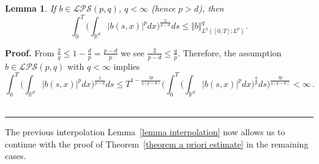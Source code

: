 \documentclass[a4paper,10pt]{article}
\newtheorem{lemma}[theorem]{Lemma}
\newenvironment{proof}[1][Proof]{\noindent\textbf{#1.} }{\ \rule{0.5em}{0.5em}}
\begin{document}
\begin{lemma}
If $b\in\mathcal{LPS}(p,q)$, $q<\infty$ (hence $p>d$), then
\begin{equation}
\int_{0}^{T} \Big( \int_{\mathbb{R}^{d}} \vert b(s,x) \vert
^{p}dx \Big)^{\frac{2}{p-d}}ds\leq \Vert b \Vert _{L^{q}([0,T];L^{p})  }^{q}. \label{bound on b} 
\end{equation}
\end{lemma}

\begin{proof}
From $\frac{2}{q}\leq1-\frac{d}{p}=\frac{p-d}{p}$ we see $\frac{2} 
{p-d}\leq\frac{q}{p}$. Therefore, the assumption $b\in\mathcal{LPS}(p,q)$ with $q<\infty$ implies
\begin{equation*}
\int_{0}^{T} \Big(\int_{\mathbb{R}^{d}} \vert b(s,x)  \vert^{p}dx \Big)^{\frac{2}{p-d}}ds \leq T^{1-\frac{2p}{q(p-d)}} \bigg( \int 
_{0}^{T} \Big( \int_{\mathbb{R}^{d}} \vert b(s,x) \vert^{p} dx \Big)^{\frac{q}{p}}ds \bigg)^{\frac{2p}{q(p-d)  }}<\infty \,.
\end{equation*}
\end{proof}

The previous interpolation Lemma~\ref{lemma interpolation} now allows us to continue with the proof of Theorem~\ref{theorem a priori estimate} in the remaining cases.
\end{document}
